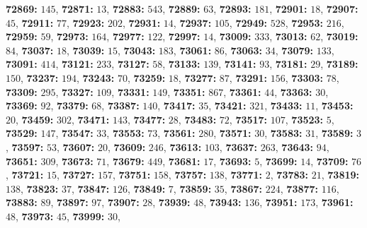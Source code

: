 \textsf{\bfseries 72869:} $145$, \textsf{\bfseries 72871:} $13$, \textsf{\bfseries 72883:} $543$, \textsf{\bfseries 72889:} $63$, \textsf{\bfseries 72893:} $181$, \textsf{\bfseries 72901:} $18$, \textsf{\bfseries 72907:} $45$, \textsf{\bfseries 72911:} $77$, \textsf{\bfseries 72923:} $202$, \textsf{\bfseries 72931:} $14$, \textsf{\bfseries 72937:} $105$, \textsf{\bfseries 72949:} $528$, \textsf{\bfseries 72953:} $216$, \textsf{\bfseries 72959:} $59$, \textsf{\bfseries 72973:} $164$, \textsf{\bfseries 72977:} $122$, \textsf{\bfseries 72997:} $14$, \textsf{\bfseries 73009:} $333$, \textsf{\bfseries 73013:} $62$, \textsf{\bfseries 73019:} $84$, \textsf{\bfseries 73037:} $18$, \textsf{\bfseries 73039:} $15$, \textsf{\bfseries 73043:} $183$, \textsf{\bfseries 73061:} $86$, \textsf{\bfseries 73063:} $34$, \textsf{\bfseries 73079:} $133$, \textsf{\bfseries 73091:} $414$, \textsf{\bfseries 73121:} $233$, \textsf{\bfseries 73127:} $58$, \textsf{\bfseries 73133:} $139$, \textsf{\bfseries 73141:} $93$, \textsf{\bfseries 73181:} $29$, \textsf{\bfseries 73189:} $150$, \textsf{\bfseries 73237:} $194$, \textsf{\bfseries 73243:} $70$, \textsf{\bfseries 73259:} $18$, \textsf{\bfseries 73277:} $87$, \textsf{\bfseries 73291:} $156$, \textsf{\bfseries 73303:} $78$, \textsf{\bfseries 73309:} $295$, \textsf{\bfseries 73327:} $109$, \textsf{\bfseries 73331:} $149$, \textsf{\bfseries 73351:} $867$, \textsf{\bfseries 73361:} $44$, \textsf{\bfseries 73363:} $30$, \textsf{\bfseries 73369:} $92$, \textsf{\bfseries 73379:} $68$, \textsf{\bfseries 73387:} $140$, \textsf{\bfseries 73417:} $35$, \textsf{\bfseries 73421:} $321$, \textsf{\bfseries 73433:} $11$, \textsf{\bfseries 73453:} $20$, \textsf{\bfseries 73459:} $302$, \textsf{\bfseries 73471:} $143$, \textsf{\bfseries 73477:} $28$, \textsf{\bfseries 73483:} $72$, \textsf{\bfseries 73517:} $107$, \textsf{\bfseries 73523:} $5$, \textsf{\bfseries 73529:} $147$, \textsf{\bfseries 73547:} $33$, \textsf{\bfseries 73553:} $73$, \textsf{\bfseries 73561:} $280$, \textsf{\bfseries 73571:} $30$, \textsf{\bfseries 73583:} $31$, \textsf{\bfseries 73589:} $3$, \textsf{\bfseries 73597:} $53$, \textsf{\bfseries 73607:} $20$, \textsf{\bfseries 73609:} $246$, \textsf{\bfseries 73613:} $103$, \textsf{\bfseries 73637:} $263$, \textsf{\bfseries 73643:} $94$, \textsf{\bfseries 73651:} $309$, \textsf{\bfseries 73673:} $71$, \textsf{\bfseries 73679:} $449$, \textsf{\bfseries 73681:} $17$, \textsf{\bfseries 73693:} $5$, \textsf{\bfseries 73699:} $14$, \textsf{\bfseries 73709:} $76$, \textsf{\bfseries 73721:} $15$, \textsf{\bfseries 73727:} $157$, \textsf{\bfseries 73751:} $158$, \textsf{\bfseries 73757:} $138$, \textsf{\bfseries 73771:} $2$, \textsf{\bfseries 73783:} $21$, \textsf{\bfseries 73819:} $138$, \textsf{\bfseries 73823:} $37$, \textsf{\bfseries 73847:} $126$, \textsf{\bfseries 73849:} $7$, \textsf{\bfseries 73859:} $35$, \textsf{\bfseries 73867:} $224$, \textsf{\bfseries 73877:} $116$, \textsf{\bfseries 73883:} $89$, \textsf{\bfseries 73897:} $97$, \textsf{\bfseries 73907:} $28$, \textsf{\bfseries 73939:} $48$, \textsf{\bfseries 73943:} $136$, \textsf{\bfseries 73951:} $173$, \textsf{\bfseries 73961:} $48$, \textsf{\bfseries 73973:} $45$, \textsf{\bfseries 73999:} $30$, 
